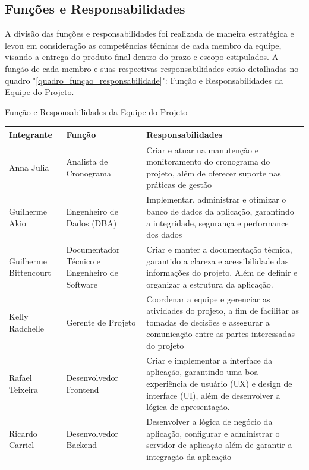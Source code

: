 \documentclass[
	12pt,				%
	openany,			%
	twoside,			%
	a4paper,			%
	english,			%
	french,				%
	spanish,			%
	brazil				%
	]{abntex2}
\begin{document}
\subsection{Funções e Responsabilidades}
A divisão das funções e responsabilidades foi realizada de maneira estratégica e levou em consideração as competências técnicas de cada membro da equipe, visando a entrega do produto final dentro do prazo e escopo estipulados. 	A função de cada membro e suas respectivas responsabilidades estão detalhadas no quadro "\ref{quadro_funçao_responsabilidade}": Função e Responsabilidades da Equipe do Projeto.
%	
\begin{quadro}[htb]
	\caption{Função e Responsabilidades da Equipe do Projeto}
	\label{quadro_funçao_responsabilidade}
	\begin{tabular}{|p{2.8cm}|p{5cm}|p{7.2cm}|}
		\hline
		\textbf{Integrante} & \textbf{Função} & \textbf{Responsabilidades} \\ \hline
		Anna Julia & Analista de Cronograma & Criar e atuar na manutenção e monitoramento do cronograma do projeto, além de oferecer suporte nas práticas de gestão  \\ \hline
		Guilherme Akio & Engenheiro de Dados (DBA) & Implementar, administrar  e otimizar o banco de dados da aplicação, garantindo a integridade, segurança e performance dos dados \\ \hline
		Guilherme \quad Bittencourt & Documentador Técnico e Engenheiro de Software & Criar e manter a documentação técnica, garantido a clareza e acessibilidade das informações do projeto. Além de definir e organizar a estrutura da aplicação.\\ \hline
		Kelly Radchelle & Gerente de Projeto & Coordenar a equipe e gerenciar as atividades  do projeto, a fim de facilitar as tomadas de decisões e  assegurar a comunicação entre as partes interessadas do projeto   \\ \hline
		Rafael Teixeira & Desenvolvedor Frontend & Criar e implementar a interface da aplicação, garantindo uma boa  experiência de usuário (UX)  e design de interface (UI), além de desenvolver a lógica de apresentação.    \\ \hline
		Ricardo Carriel & Desenvolvedor Backend & Desenvolver a lógica de negócio da aplicação, configurar e administrar o servidor de aplicação  além de garantir a integração da aplicação  \\ \hline
	\end{tabular}
\end{quadro}
\end{document}
